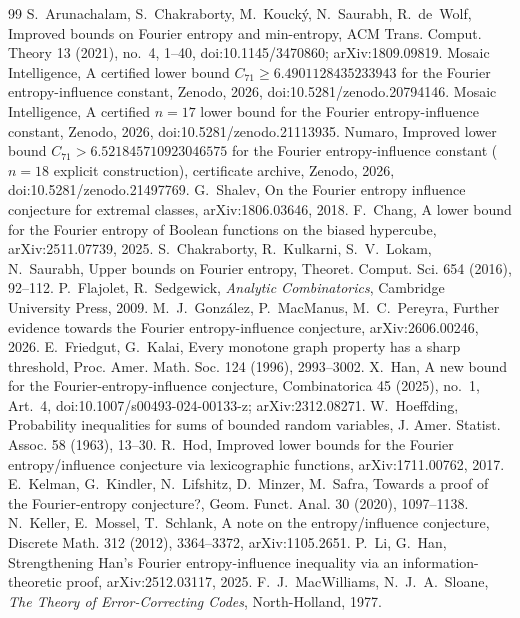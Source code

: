 \documentclass[11pt]{amsart}
\theoremstyle{remark}
\begin{document}
\begin{thebibliography}{99}
 S.~Arunachalam, S.~Chakraborty, M.~Kouck\'y, N.~Saurabh, R.~de~Wolf, Improved bounds on Fourier
entropy and min-entropy, ACM Trans. Comput. Theory 13 (2021), no.~4, 1--40, doi:10.1145/3470860; arXiv:1809.09819.
 Mosaic Intelligence, A certified lower bound $C_{71}\ge 6.4901128435233943$ for the Fourier entropy-influence constant, Zenodo, 2026, doi:10.5281/zenodo.20794146.
 Mosaic Intelligence, A certified $n=17$ lower bound for the Fourier entropy-influence constant, Zenodo, 2026, doi:10.5281/zenodo.21113935.
 Numaro, Improved lower bound $C_{71}>6.521845710923046575$ for the Fourier entropy-influence constant ($n=18$ explicit construction), certificate archive, Zenodo, 2026, doi:10.5281/zenodo.21497769.
 G.~Shalev, On the Fourier entropy influence conjecture for extremal classes, arXiv:1806.03646, 2018.
 F.~Chang, A lower bound for the Fourier entropy of Boolean functions on the biased hypercube,
arXiv:2511.07739, 2025.
 S.~Chakraborty, R.~Kulkarni, S.~V.~Lokam, N.~Saurabh, Upper bounds on Fourier entropy, Theoret.
Comput. Sci. 654 (2016), 92--112.
 P.~Flajolet, R.~Sedgewick, \emph{Analytic Combinatorics}, Cambridge University Press, 2009.
 M.~J.~Gonz\'alez, P.~MacManus, M.~C.~Pereyra, Further evidence towards the Fourier entropy-influence
conjecture, arXiv:2606.00246, 2026.
 E.~Friedgut, G.~Kalai, Every monotone graph property has a sharp threshold, Proc. Amer. Math. Soc.
124 (1996), 2993--3002.
 X.~Han, A new bound for the Fourier-entropy-influence conjecture, Combinatorica 45 (2025), no.~1,
Art.~4, doi:10.1007/s00493-024-00133-z; arXiv:2312.08271.
 W.~Hoeffding, Probability inequalities for sums of bounded random variables, J. Amer. Statist. Assoc.
58 (1963), 13--30.
 R.~Hod, Improved lower bounds for the Fourier entropy/influence conjecture via lexicographic functions,
arXiv:1711.00762, 2017.
 E.~Kelman, G.~Kindler, N.~Lifshitz, D.~Minzer, M.~Safra, Towards a proof of the Fourier-entropy
conjecture?, Geom. Funct. Anal. 30 (2020), 1097--1138.
 N.~Keller, E.~Mossel, T.~Schlank, A note on the entropy/influence conjecture, Discrete Math. 312
(2012), 3364--3372, arXiv:1105.2651.
 P.~Li, G.~Han, Strengthening Han's Fourier entropy-influence inequality via an
information-theoretic proof, arXiv:2512.03117, 2025.
 F.~J.~MacWilliams, N.~J.~A.~Sloane, \emph{The Theory of Error-Correcting Codes}, North-Holland, 1977.

\end{thebibliography}
\end{document}
